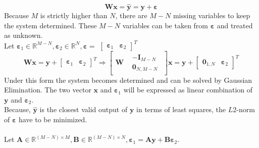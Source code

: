 \documentclass{article}
\begin{document}
\begin{equation*}
    \textbf{Wx}= \widehat{\textbf{y}} = \textbf{y} + \boldsymbol{\varepsilon}
\end{equation*}
Because $M$ is strictly higher than $N$, there are $M-N$ missing variables to keep the system determined.
These $M-N$ variables can be taken from $\boldsymbol{\varepsilon}$ and treated as unknown.
\\Let $ \boldsymbol{\varepsilon}_{1} \in \mathbb{R}^{M-N}, \boldsymbol{\varepsilon}_{2} \in \mathbb{R}^{N},\boldsymbol{\varepsilon} =$
$
\begin{bmatrix}
    \boldsymbol{\varepsilon}_{1}
    & \boldsymbol{\varepsilon}_{2}
\end{bmatrix}^{T}
$
\begin{equation*}
    \textbf{Wx}
    = 
    \textbf{y}
     + 
     \begin{bmatrix}
        \boldsymbol{\varepsilon}_{1}
        & \boldsymbol{\varepsilon}_{2}
    \end{bmatrix}^{T} 
    \Rightarrow
    \begin{bmatrix}
        \textbf{W}
        & 
        \begin{matrix}
        -\textbf{I}_{M-N}\\
        \textbf{0}_{N,M-N}
        \end{matrix}
    \end{bmatrix}
    \textbf{x} =
    \textbf{y}
     + 
     \begin{bmatrix}
        \textbf{0}_{1,N}
        & \boldsymbol{\varepsilon}_{2}
    \end{bmatrix}^{T} 
\end{equation*}
Under this form the system becomes determined and can be solved by Gaussian Elimination.
The two vector $\textbf{x}$ and $\boldsymbol{\varepsilon}_{1}$ will be expressed as linear combination of 
$\textbf{y}$ and $\boldsymbol{\varepsilon}_{2}$. \\
Because, $\widehat{\textbf{y}}$ is the closest valid output of $\textbf{y}$ in terms of least squares,
the $L2$-norm of $\boldsymbol{\varepsilon}$ have to be minimized.\\\\
Let $\textbf{A} \in \mathbb{R}^{(M-N) \times M},\textbf{B} \in \mathbb{R}^{(M-N) \times N}, 
\boldsymbol{\varepsilon}_{1} = \textbf{A}\textbf{y} + \textbf{B}\boldsymbol{\varepsilon}_{2}$.\\
\end{document}
